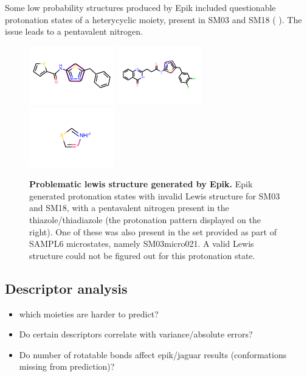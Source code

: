 \documentclass[9pt,lineno,final]{elife}
\begin{document}
Some low probability structures produced by Epik included questionable protonation states of a heterycyclic moiety, present in SM03 and SM18 ( ).  The issue leads to a pentavalent nitrogen.



\begin{figure}[H]	
\centering
\includegraphics[width=0.33\textwidth]{Images/Molecules/SM03-smarts.pdf}
\includegraphics[width=0.33\textwidth]{Images/Molecules/SM18-smarts.pdf}
\includegraphics[width=0.33\textwidth]{Images/Molecules/lewis-problem.pdf}
\caption{{\bf Problematic lewis structure generated by Epik.}
Epik generated protonation states with invalid Lewis structure for SM03 and SM18, with a pentavalent nitrogen present in the thiazole/thiadiazole (the protonation pattern displayed on the right). One of these was also present in the set provided as part of SAMPL6  microstates, namely SM03\textunderscore{}micro021. A valid Lewis structure could not be figured out for this protonation state.}
\label{fig:lewis-structure-SM03-SM18}
\end{figure}		

\subsection{Descriptor analysis}
\begin{itemize}
	\item which moieties are harder to predict?
	\item Do certain descriptors correlate with variance/absolute errors?
	\item Do number of rotatable bonds affect epik/jaguar results (conformations missing from prediction)?
\end{itemize}
\end{document}
